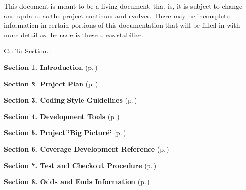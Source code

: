  This document is meant to be a living document, that is, it is subject to change and updates as the project continues and evolves. There may be incomplete information in certain portions of this documentation that will be filled in with more detail as the code is these areas stabilize.



\begin{Desc}
\item[Go To Section...]\par
\begin{CompactItemize}
\item 
{\bf Section 1.  Introduction} {\rm (p.\,\pageref{page_intro})}\item 
{\bf Section 2.  Project Plan} {\rm (p.\,\pageref{page_project_plan})}\item 
{\bf Section 3.  Coding Style Guidelines} {\rm (p.\,\pageref{page_code_style})}\item 
{\bf Section 4.  Development Tools} {\rm (p.\,\pageref{page_tools})}\item 
{\bf Section 5.  Project \char`\"{}Big Picture\char`\"{}} {\rm (p.\,\pageref{page_big_picture})}\item 
{\bf Section 6.  Coverage Development Reference} {\rm (p.\,\pageref{page_code_details})}\item 
{\bf Section 7.  Test and Checkout Procedure} {\rm (p.\,\pageref{page_testing})}\item 
{\bf Section 8.  Odds and Ends Information} {\rm (p.\,\pageref{page_misc})}\end{CompactItemize}
\end{Desc}
